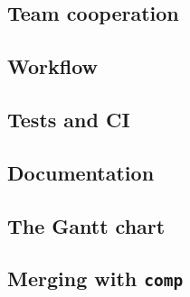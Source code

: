 \documentclass[a4paper,12pt]{article}
\begin{document}
\subsection{Team cooperation} %
\subsection{Workflow} %
\subsection{Tests and CI} %
\subsection{Documentation}
\subsection{The Gantt chart}
\subsection{Merging with \texttt{comp}}

\pagebreak
\printbibliography
\end{document}
